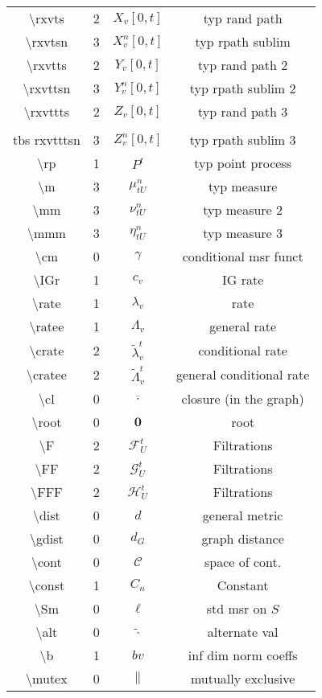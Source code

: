 \documentclass[12pt]{article}
\newcommand{\mc}{\mathcal}
\newcommand{\ov}{\overline}
\newcommand{\tbs}{\textbackslash}
\renewcommand{\root}{\mathbf{0}}				%
\renewcommand{\v}{v}							%
\renewcommand{\U}{U}							%
\renewcommand{\S}{S}							%
\renewcommand{\b}{b}							%
\renewcommand{\t}{t}							%
\newcommand{\cl}{\ov}							%
\newcommand{\numb}{n}								%
\newcommand{\rxvts}[2]{X_{#1}{#2}}					%
\newcommand{\rxvtsn}[3]{X_{#1}^{#3}{#2}}			%
\newcommand{\rxvtts}[2]{Y_{#1}{#2}}					%
\newcommand{\rxvttsn}[3]{Y_{#1}^{#3}{#2}}			%
\newcommand{\rxvttts}[2]{Z_{#1}{#2}}				%
\newcommand{\rxvtttsn}[3]{Z_{#1}^{#3}{#2}}			%
\newcommand{\rp}[1]{P^{#1}}							%
\newcommand{\m}[3]{\mu_{#2#1}^{#3}}						%
\newcommand{\mm}[3]{\nu_{#2#1}^{#3}}						%
\newcommand{\mmm}[3]{\eta_{#2#1}^{#3}}						%
\newcommand{\cm}{\gamma}							%
\newcommand{\IGr}[1]{c_{#1}}						%
\newcommand{\rate}[1]{\lambda_{#1}}					%
\newcommand{\ratee}[1]{\Lambda_{#1}}				%
\newcommand{\crate}[2]{\alt{\lambda}_{#1}^{#2}}		%
\newcommand{\cratee}[2]{\alt{\Lambda}_{#1}^{#2}} 	%
\newcommand{\F}[2]{\mc{F}_{#1}^{#2}}				%
\newcommand{\FF}[2]{\mc{G}_{#1}^{#2}}				%
\newcommand{\FFF}[2]{\mc{H}_{#1}^{#2}}				%
\newcommand{\dist}{d}								%
\newcommand{\gdist}{d_G}							%
\newcommand{\cont}{\mc{C}}							%
\newcommand{\const}[1]{C_{#1}}						%
\newcommand{\Sm}{\ell}								%
\newcommand{\alt}{\widetilde}						%
\newcommand{\mutex}{\|}								%
\begin{document}
\begin{longtable}{c|c|c|c}
\tbs rxvts&2&\(\rxvts{\v}{[0,\t]}\)					&typ rand path\\
\tbs rxvtsn&3&\(\rxvtsn{\v}{[0,\t]}{\numb}\)	&typ rpath sublim\\
\tbs rxvtts&2&\(\rxvtts{\v}{[0,\t]}\)					&typ rand path 2\\
\tbs rxvttsn&3&\(\rxvttsn{\v}{[0,\t]}{\numb}\)	&typ rpath sublim 2\\
\tbs rxvttts&2&\(\rxvttts{\v}{[0,\t]}\)				&typ rand path 3\\\\tbs rxvtttsn&3&\(\rxvtttsn{\v}{[0,\t]}{\numb}\)	&typ rpath sublim 3\\
\tbs rp&1& \(\rp{\t}\)						&typ point process\\
\tbs m&3&\(\m{\U}{\t}{\numb}\)						&typ measure\\
\tbs mm&3&\(\mm{\U}{\t}{\numb}\)						&typ measure 2\\
\tbs mmm&3&\(\mmm{\U}{\t}{\numb}\)						&typ measure 3\\
\tbs cm&0&\(\cm\)							&conditional msr funct\\
\tbs IGr&1&\(\IGr{\v}\)						&IG rate\\
\tbs rate&1&\(\rate{\v}\)					&rate\\
\tbs ratee&1&\(\ratee{\v}\)					&general rate\\
\tbs crate&2&\(\crate{\v}{\t}\)		&conditional rate\\
\tbs cratee&2&\(\cratee{\v}{\t}\)		&general conditional rate\\
\tbs cl&0&\(\cl{\cdot}\)			&closure (in the graph)\\
\tbs root&0&\(\root\)				&root\\
\tbs F&2&\(\F{\U}{\t}\)&Filtrations\\
\tbs FF&2&\(\FF{\U}{\t}\)&Filtrations\\
\tbs FFF&2&\(\FFF{\U}{\t}\)&Filtrations\\
\tbs dist&0& \(\dist\)				&general metric\\
\tbs gdist &0& \(\gdist\)			&graph distance\\
\tbs cont &0& \(\cont\)				&space of cont. \\
\tbs const &1& \(\const{\numb}\)	&Constant\\
\tbs Sm&0&\(\Sm\)							&std msr on \(\S\)\\
\tbs alt&0&\(\widetilde{\cdot}\)			&alternate val\\
\tbs b&1& \(\b{\v}\)						&inf dim norm coeffs\\
\tbs mutex&0&\(\mutex\)						&mutually exclusive\\

\end{longtable}
\end{document}
